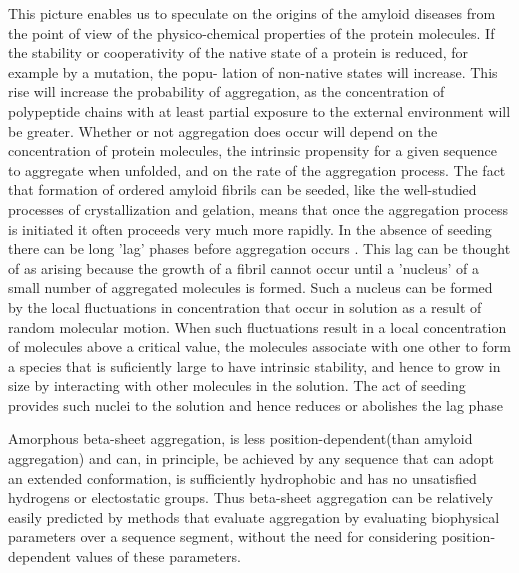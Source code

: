 This picture enables us to speculate on the origins of
the amyloid diseases from the point of view of the
physico-chemical properties of the protein molecules. If
the stability or cooperativity of the native state of a
protein is reduced, for example by a mutation, the popu-
lation of non-native states will increase.
This rise will increase the probability of aggregation, as the
concentration of polypeptide chains with at least partial
exposure to the external environment will be greater.
Whether or not aggregation does occur will depend on
the concentration of protein molecules, the intrinsic
propensity for a given sequence to aggregate when
unfolded, and on the rate of the aggregation process. The
fact that formation of ordered amyloid fibrils can be
seeded, like the well-studied processes of crystallization
and gelation, means that once the aggregation process is
initiated it often proceeds very much more rapidly.
In the absence of seeding there can be
long 'lag' phases before aggregation occurs .
This lag can be thought of as arising because the growth
of a fibril cannot occur until a 'nucleus' of a small number
of aggregated molecules is formed. Such a nucleus can be
formed by the local fluctuations in concentration that
occur in solution as a result of random molecular motion.
When such fluctuations result in a local concentration of
molecules above a critical value, the molecules associate
with one other to form a species that is suficiently large
to have intrinsic stability, and hence to grow in size by
interacting with other molecules in the solution. The act
of seeding provides such nuclei to the solution and hence
reduces or abolishes the lag phase








Amorphous beta-sheet aggregation, is less position-dependent(than amyloid aggregation) and can, in principle, be achieved by any sequence that can adopt an extended conformation, is sufficiently hydrophobic and has no unsatisfied hydrogens or electostatic groups. 
Thus beta-sheet aggregation can be relatively easily predicted by methods that evaluate aggregation by evaluating biophysical parameters over a sequence segment, without the need for considering position-dependent values of these parameters.
















